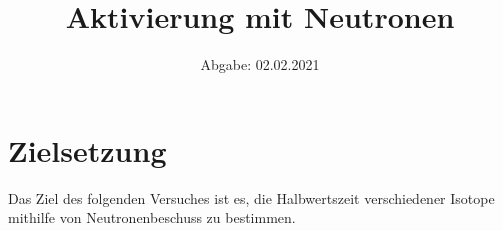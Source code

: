 

\subject{D702}
\title{Aktivierung mit Neutronen}
\date{
    Abgabe: 02.02.2021
}



\maketitle
\thispagestyle{empty}
\tableofcontents
\newpage

\section{Zielsetzung}

    Das Ziel des folgenden Versuches ist es,
    die Halbwertszeit verschiedener Isotope mithilfe von Neutronenbeschuss zu bestimmen.


\clearpage


\clearpage


\clearpage


\clearpage

\printbibliography



